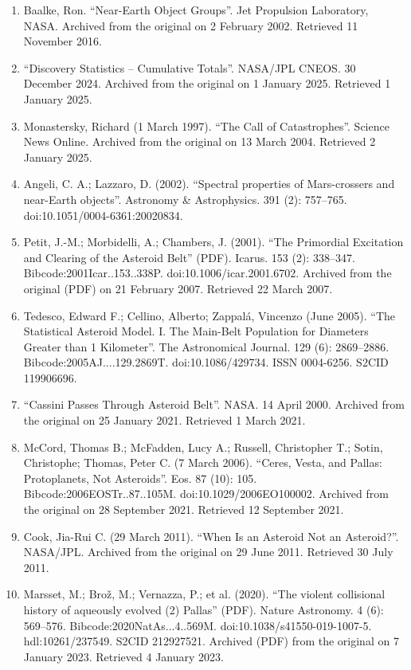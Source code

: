 \begin{enumerate}
\item Baalke, Ron. ``Near-Earth Object Groups''. Jet Propulsion Laboratory, NASA. Archived from the original on 2 February 2002. Retrieved 11 November 2016.
\item ``Discovery Statistics – Cumulative Totals''. NASA/JPL CNEOS. 30 December 2024. Archived from the original on 1 January 2025. Retrieved 1 January 2025.
\item Monastersky, Richard (1 March 1997). ``The Call of Catastrophes''. Science News Online. Archived from the original on 13 March 2004. Retrieved 2 January 2025.
\item Angeli, C. A.; Lazzaro, D. (2002). ``Spectral properties of Mars-crossers and near-Earth objects''. Astronomy \& Astrophysics. 391 (2): 757–765. doi:10.1051/0004-6361:20020834.
\item Petit, J.-M.; Morbidelli, A.; Chambers, J. (2001). ``The Primordial Excitation and Clearing of the Asteroid Belt'' (PDF). Icarus. 153 (2): 338–347. Bibcode:2001Icar..153..338P. doi:10.1006/icar.2001.6702. Archived from the original (PDF) on 21 February 2007. Retrieved 22 March 2007.
\item Tedesco, Edward F.; Cellino, Alberto; Zappalá, Vincenzo (June 2005). ``The Statistical Asteroid Model. I. The Main-Belt Population for Diameters Greater than 1 Kilometer''. The Astronomical Journal. 129 (6): 2869–2886. Bibcode:2005AJ....129.2869T. doi:10.1086/429734. ISSN 0004-6256. S2CID 119906696.
\item ``Cassini Passes Through Asteroid Belt''. NASA. 14 April 2000. Archived from the original on 25 January 2021. Retrieved 1 March 2021.
\item McCord, Thomas B.; McFadden, Lucy A.; Russell, Christopher T.; Sotin, Christophe; Thomas, Peter C. (7 March 2006). ``Ceres, Vesta, and Pallas: Protoplanets, Not Asteroids''. Eos. 87 (10): 105. Bibcode:2006EOSTr..87..105M. doi:10.1029/2006EO100002. Archived from the original on 28 September 2021. Retrieved 12 September 2021.
\item Cook, Jia-Rui C. (29 March 2011). ``When Is an Asteroid Not an Asteroid?''. NASA/JPL. Archived from the original on 29 June 2011. Retrieved 30 July 2011.
\item Marsset, M.; Brož, M.; Vernazza, P.; et al. (2020). ``The violent collisional history of aqueously evolved (2) Pallas'' (PDF). Nature Astronomy. 4 (6): 569–576. Bibcode:2020NatAs...4..569M. doi:10.1038/s41550-019-1007-5. hdl:10261/237549. S2CID 212927521. Archived (PDF) from the original on 7 January 2023. Retrieved 4 January 2023.

\end{enumerate}
